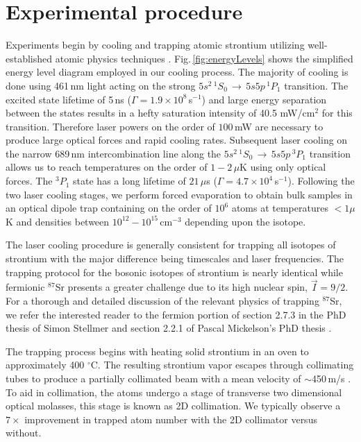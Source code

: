 \section{Experimental procedure} \label{sec:trapping}
\setcounter{footnote}{0}
Experiments begin by cooling and trapping atomic strontium utilizing well-established atomic physics techniques \cite{mvs99,Katori1999,Ido2000,Nagel2003,Mukaiyama2003a,Loftus2004,mmy09a,sth09a,Mickelson2010ja,Tey2010a,dym10,stg10}.
Fig.\,\ref{fig:energyLevels} shows the simplified energy level diagram employed in our cooling process.
The majority of cooling is done using 461\,nm light acting on the strong $5s^2\,^1S_0\,\rightarrow\,5s5p\,^1P_1$ transition.
The excited state lifetime of 5\,ns ($\Gamma=1.9 \times 10^8$\,s$^{-1}$) and large energy separation between the states results in a hefty saturation intensity of 40.5 mW/cm$^2$ for this transition.
Therefore laser powers on the order of $100\,$mW are necessary to produce large optical forces and rapid cooling rates.
Subsequent laser cooling on the narrow 689\,nm intercombination line along the $5s^2\,^1S_0\,\rightarrow\,5s5p\,^3P_1$ transition allows us to reach temperatures on the order of $1-2\,\mu$K using only optical forces.
The $^3P_1$ state has a long lifetime of $21\,\mu$s ($\Gamma=4.7 \times 10^4$\,s$^{-1}$).
Following the two laser cooling stages, we perform forced evaporation to obtain bulk samples in an optical dipole trap containing on the order of $10^6$ atoms at temperatures $<1\mu$K and densities between $10^{12} - 10^{15}\,$cm$^{-3}$ depending upon the isotope. 

The laser cooling procedure is generally consistent for trapping all isotopes of strontium with the major difference being timescales and laser frequencies.
The trapping protocol for the bosonic isotopes of strontium is nearly identical while fermionic $^{87}$Sr presents a greater challenge due to its high nuclear spin, $\vec{I}=9/2$.
For a thorough and detailed discussion of the relevant physics of trapping $^{87}$Sr, we refer the interested reader to the fermion portion of section 2.7.3 in the PhD thesis of Simon Stellmer \cite{SimonStellmer2013} and section 2.2.1 of Pascal Mickelson's PhD thesis \cite{Mickelson2010b}.

The trapping process begins with heating solid strontium in an oven to approximately 400 $^{\circ}$C. 
The resulting strontium vapor escapes through collimating tubes to produce a partially collimated beam with a mean velocity of $\sim$450\,m/s \cite{Mazurenko2010}.
To aid in collimation, the atoms undergo a stage of transverse two dimensional optical molasses, this stage is known as 2D collimation.
We typically observe a $7\times$ improvement in trapped atom number with the 2D collimator versus without.

